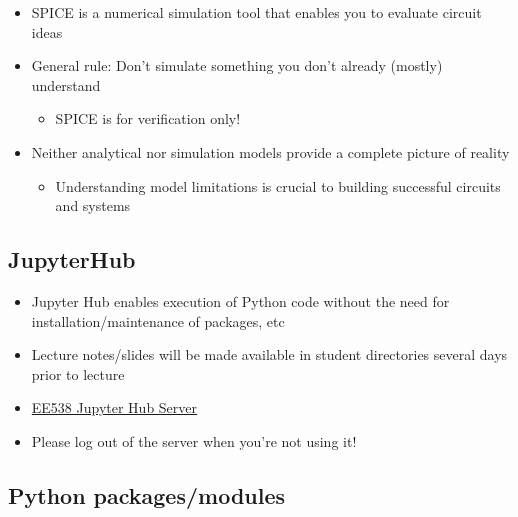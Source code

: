 \documentclass[11pt]{article}
\providecommand{\tightlist}{%
      \setlength{\itemsep}{0pt}\setlength{\parskip}{0pt}}
\begin{document}
    \begin{itemize}
\tightlist
\item
  SPICE is a numerical simulation tool that enables you to evaluate
  circuit ideas
\item
  General rule: Don't simulate something you don't already (mostly)
  understand

  \begin{itemize}
  \tightlist
  \item
    SPICE is for verification only!
  \end{itemize}
\item
  Neither analytical nor simulation models provide a complete picture of
  reality

  \begin{itemize}
  \tightlist
  \item
    Understanding model limitations is crucial to building successful
    circuits and systems
  \end{itemize}
\end{itemize}

    \hypertarget{jupyterhub}{%
\subsection{JupyterHub}\label{jupyterhub}}

    \begin{itemize}
\tightlist
\item
  Jupyter Hub enables execution of Python code without the need for
  installation/maintenance of packages, etc
\item
  Lecture notes/slides will be made available in student directories
  several days prior to lecture
\item
  \href{https://rttl.axdd.s.uw.edu/2021-winter-e-e-538-c}{EE538 Jupyter
  Hub Server}
\item
  Please log out of the server when you're not using it!
\end{itemize}

    \hypertarget{python-packagesmodules}{%
\subsection{Python packages/modules}\label{python-packagesmodules}}
\end{document}
